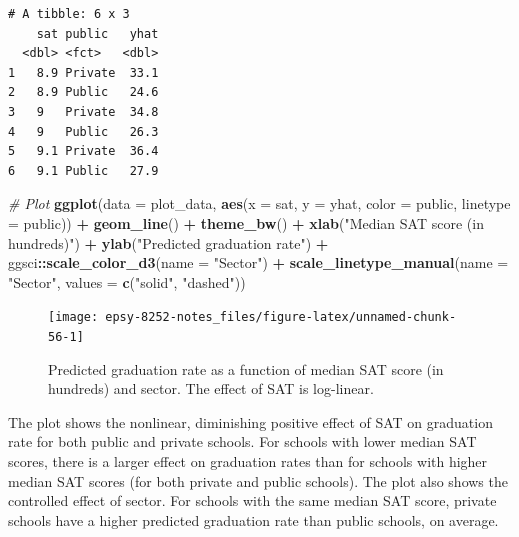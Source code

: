 \documentclass[]{book}
\newenvironment{Shaded}{\begin{snugshade}}{\end{snugshade}}
\newcommand{\CommentTok}[1]{\textcolor[rgb]{0.56,0.35,0.01}{\textit{#1}}}
\newcommand{\DataTypeTok}[1]{\textcolor[rgb]{0.13,0.29,0.53}{#1}}
\newcommand{\KeywordTok}[1]{\textcolor[rgb]{0.13,0.29,0.53}{\textbf{#1}}}
\newcommand{\NormalTok}[1]{#1}
\newcommand{\OperatorTok}[1]{\textcolor[rgb]{0.81,0.36,0.00}{\textbf{#1}}}
\newcommand{\StringTok}[1]{\textcolor[rgb]{0.31,0.60,0.02}{#1}}
\begin{document}
\begin{verbatim}
# A tibble: 6 x 3
    sat public   yhat
  <dbl> <fct>   <dbl>
1   8.9 Private  33.1
2   8.9 Public   24.6
3   9   Private  34.8
4   9   Public   26.3
5   9.1 Private  36.4
6   9.1 Public   27.9
\end{verbatim}

\begin{Shaded}
\begin{Highlighting}[]
\CommentTok{# Plot}
\KeywordTok{ggplot}\NormalTok{(}\DataTypeTok{data =}\NormalTok{ plot_data, }\KeywordTok{aes}\NormalTok{(}\DataTypeTok{x =}\NormalTok{ sat, }\DataTypeTok{y =}\NormalTok{ yhat, }\DataTypeTok{color =}\NormalTok{ public, }\DataTypeTok{linetype =}\NormalTok{ public)) }\OperatorTok{+}
\StringTok{  }\KeywordTok{geom_line}\NormalTok{() }\OperatorTok{+}
\StringTok{  }\KeywordTok{theme_bw}\NormalTok{() }\OperatorTok{+}
\StringTok{  }\KeywordTok{xlab}\NormalTok{(}\StringTok{"Median SAT score (in hundreds)"}\NormalTok{) }\OperatorTok{+}
\StringTok{  }\KeywordTok{ylab}\NormalTok{(}\StringTok{"Predicted graduation rate"}\NormalTok{) }\OperatorTok{+}
\StringTok{  }\NormalTok{ggsci}\OperatorTok{::}\KeywordTok{scale_color_d3}\NormalTok{(}\DataTypeTok{name =} \StringTok{"Sector"}\NormalTok{) }\OperatorTok{+}
\StringTok{  }\KeywordTok{scale_linetype_manual}\NormalTok{(}\DataTypeTok{name =} \StringTok{"Sector"}\NormalTok{, }\DataTypeTok{values =} \KeywordTok{c}\NormalTok{(}\StringTok{"solid"}\NormalTok{, }\StringTok{"dashed"}\NormalTok{))}
\end{Highlighting}
\end{Shaded}

\begin{figure}

{\centering \texttt{[image: epsy-8252-notes\_files/figure-latex/unnamed-chunk-56-1]} 

}

\caption{Predicted graduation rate as a function of median SAT score (in hundreds) and sector. The effect of SAT is log-linear.}\label{fig:unnamed-chunk-56}
\end{figure}

The plot shows the nonlinear, diminishing positive effect of SAT on graduation rate for both public and private schools. For schools with lower median SAT scores, there is a larger effect on graduation rates than for schools with higher median SAT scores (for both private and public schools). The plot also shows the controlled effect of sector. For schools with the same median SAT score, private schools have a higher predicted graduation rate than public schools, on average.
\end{document}

